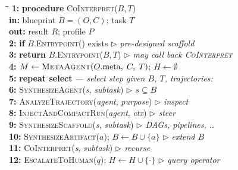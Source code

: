\begin{algorithm}[t]
\caption{Co-interpretation. A meta agent interprets a blueprint to orchestrate a task-specific agentic system. The offline process can override the entrypoint to run a different interpretation strategy, with this default loop as a callback if desired.}
\label{alg:cointerpret}
\small
\newcommand{\algcomm}[1]{\hfill{\color{synComment}\itshape$\triangleright$ #1}}
\newcommand{\algln}[1]{\textbf{#1:}}
\begin{tabbing}
\hspace{1.6em}\=\hspace{1.5em}\=\hspace{1.5em}\=\hspace{1.5em}\=\kill
\algln{1} \> \textbf{procedure} \textsc{CoInterpret}($B, T$) \\
        \> \> \textbf{in:} blueprint $B = (O,C)$;\; task $T$ \\
        \> \> \textbf{out:} result $R$;\; profile $P$ \\
\algln{2} \> \> \textbf{if} $B$.\textsc{Entrypoint}() exists \algcomm{pre-designed scaffold} \\
\algln{3} \> \> \> \textbf{return} $B$.\textsc{Entrypoint}($B, T$) \algcomm{may call back \textsc{CoInterpret}} \\
\algln{4} \> \> $M \gets \textsc{MetaAgent}(O.\mathrm{meta},\; C,\; T)$;\; $H \gets \emptyset$ \\
\algln{5} \> \> \textbf{repeat select} \textit{\textcolor{synComment}{--- select step given $B$, $T$, trajectories:}} \\
\algln{6} \> \> \> \textsc{SynthesizeAgent}(\textit{s}, \textit{subtask}) \algcomm{$\textit{s} \subseteq B$} \\
\algln{7} \> \> \> \quad\textsc{AnalyzeTrajectory}(\textit{agent}, \textit{purpose}) \algcomm{inspect} \\
\algln{8} \> \> \> \quad\textsc{InjectAndCompactRun}(\textit{agent}, \textit{ctx}) \algcomm{steer} \\
\algln{9} \> \> \> \textsc{SynthesizeScaffold}(\textit{s}, \textit{subtask}) \algcomm{DAGs, pipelines, \ldots} \\
\algln{10} \> \> \> \textsc{SynthesizeArtifact}($a$);\; $B \gets B \cup \{a\}$ \algcomm{extend $B$} \\
\algln{11} \> \> \> \textsc{CoInterpret}(\textit{s}, \textit{subtask}) \algcomm{recurse} \\
\algln{12} \> \> \> \textsc{EscalateToHuman}($q$);\; $H \gets H \cup \{\cdot\}$ \algcomm{query operator} \\

\end{tabbing}
\end{algorithm}
